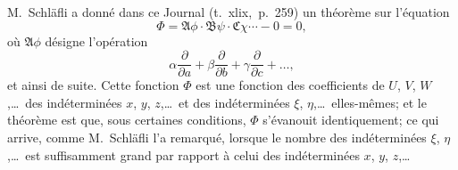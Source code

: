 \documentclass[11pt,a4paper]{article}
\theoremstyle{definition}
\begin{document}
\medskip

\textsc{M.}~Schl\"afli a donn\'e dans ce Journal (t.\ xlix,\ p.\ 259) un
th\'eor\`eme sur l'\'equation
\[
\Phi = \mathfrak{A}\phi \cdot \mathfrak{B}\psi \cdot \mathfrak{C}\chi \cdots - 0 = 0,
\]
o\`u $\mathfrak{A}\phi$ d\'esigne l'op\'eration
\[
\alpha\frac{\partial}{\partial a}
+ \beta\frac{\partial}{\partial b}
+ \gamma\frac{\partial}{\partial c} + \ldots,
\]
et ainsi de suite. Cette fonction $\Phi$ est une fonction des coefficients
de $U$, $V$, $W$,\ldots\ des ind\'etermin\'ees $x$, $y$, $z$,\ldots\ et des
ind\'etermin\'ees $\xi$, $\eta$,\ldots\ elles-m\^emes; et le th\'eor\`eme est
que, sous certaines conditions, $\Phi$ s'\'evanouit identiquement; ce qui
arrive, comme M.~Schl\"afli l'a remarqu\'e, lorsque le nombre des
ind\'etermin\'ees $\xi$, $\eta$,\ldots\ est suffisamment grand par rapport \`a
celui des ind\'etermin\'ees $x$, $y$, $z$,\ldots
\end{document}
